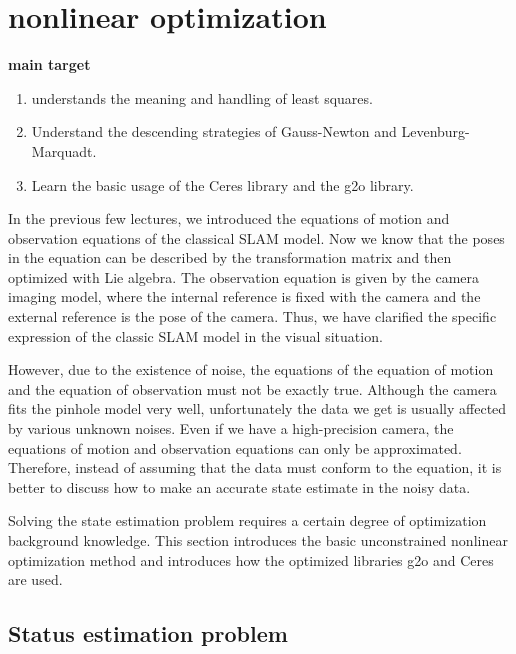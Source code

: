 \chapter{nonlinear optimization}
\label{cpt:6}
\begin{mdframed}
\textbf{main target}
\begin{enumerate}[labelindent=0em,leftmargin=1.5em]
\item understands the meaning and handling of least squares.
\item Understand the descending strategies of Gauss-Newton and Levenburg-\\Marquadt.
\item Learn the basic usage of the Ceres library and the g2o library.
\end{enumerate}
\end{mdframed}

In the previous few lectures, we introduced the equations of motion and observation equations of the classical SLAM model. Now we know that the poses in the equation can be described by the transformation matrix and then optimized with Lie algebra. The observation equation is given by the camera imaging model, where the internal reference is fixed with the camera and the external reference is the pose of the camera. Thus, we have clarified the specific expression of the classic SLAM model in the visual situation.

However, due to the existence of noise, the equations of the equation of motion and the equation of observation must not be exactly true. Although the camera fits the pinhole model very well, unfortunately the data we get is usually affected by various unknown noises. Even if we have a high-precision camera, the equations of motion and observation equations can only be approximated. Therefore, instead of assuming that the data must conform to the equation, it is better to discuss how to make an accurate state estimate in the noisy data.

Solving the state estimation problem requires a certain degree of optimization background knowledge. This section introduces the basic unconstrained nonlinear optimization method and introduces how the optimized libraries g2o and Ceres are used.

\newpage


\newpage
\section{Status estimation problem}
